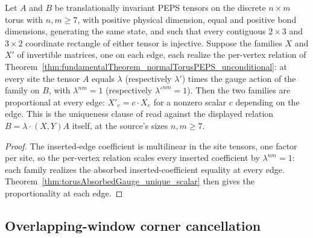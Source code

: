 \begin{theorem}%
    \label{thm:torusGauge_unique_scalar_of_perVertex}
    \leanok
    Let $A$ and $B$ be translationally invariant PEPS tensors on the discrete
    $n\times m$ torus with $n,m\geq 7$, with positive physical dimension,
    equal and positive bond dimensions, generating the same state, and such
    that every contiguous
    $2\times 3$ and $3\times 2$ coordinate rectangle of either tensor is
    injective.  Suppose the families $X$ and $X'$ of invertible matrices, one
    on each edge, each realize the per-vertex relation of
    Theorem~\ref{thm:fundamentalTheorem_normalTorusPEPS_unconditional}: at
    every site the tensor $A$ equals $\lambda$ (respectively $\lambda'$)
    times the gauge action of the family on $B$, with $\lambda^{nm} = 1$
    (respectively $\lambda'^{nm} = 1$).  Then the two families are
    proportional at every edge: $X'_e = c\cdot X_e$ for a nonzero scalar $c$
    depending on the edge.
    This is the uniqueness clause of \cite[Theorem~3]{Molnar2018NormalPEPS}
    read against the displayed relation $B = \lambda\cdot(X,Y)A$ itself, at
    the source's sizes $n,m\geq 7$.
    \begin{proof}
        \leanok
        The inserted-edge coefficient is multilinear in the site tensors, one
        factor per site, so the per-vertex relation scales every inserted
        coefficient by $\lambda^{nm} = 1$: each family realizes the absorbed
        inserted-coefficient equality at every edge.
        Theorem~\ref{thm:torusAbsorbedGauge_unique_scalar} then gives the
        proportionality at each edge.
    \end{proof}
\end{theorem}

\subsection{Overlapping-window corner cancellation}
\label{subsec:peps_torus_overlap_corner_cancellation}

